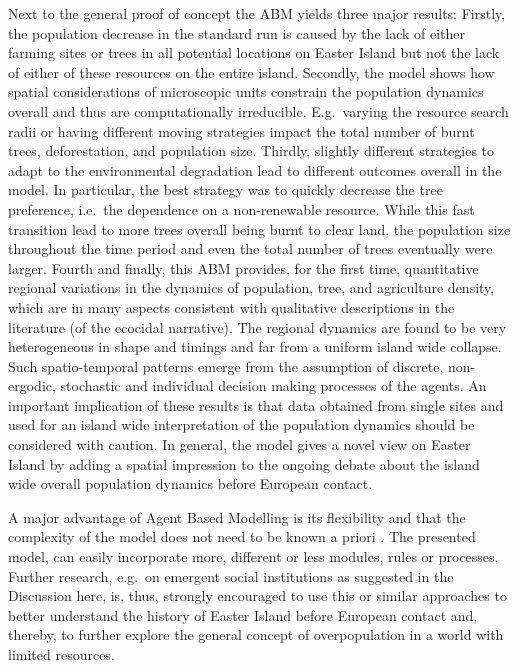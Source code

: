 Next to the general proof of concept the ABM yields three major results:
Firstly, the population decrease in the standard run is caused by the lack of either farming sites or trees in all potential locations on Easter Island but not the lack of either of these resources on the entire island.
Secondly, the model shows how spatial considerations of microscopic units constrain the population dynamics overall and thus are computationally irreducible.
E.g.\ varying the resource search radii or having different moving strategies impact the total number of burnt trees, deforestation, and population size.
Thirdly, slightly different strategies to adapt to the environmental degradation lead to different outcomes overall in the model. 
In particular, the best strategy was to quickly decrease the tree preference, i.e.\ the dependence on a non-renewable resource. While this fast transition lead to more trees overall being burnt to clear land, the population size throughout the time period and even the total number of trees eventually were larger. 
Fourth and finally, this ABM provides, for the first time, quantitative regional variations in the dynamics of population, tree, and agriculture density, which are in many aspects consistent with qualitative descriptions in the literature (of the ecocidal narrative).
The regional dynamics are found to be very heterogeneous in shape and timings and far from a uniform island wide collapse.
Such spatio-temporal patterns emerge from the assumption of discrete, non-ergodic, stochastic and individual decision making processes of the agents.
An important implication of these results is that data obtained from single sites and used for an island wide interpretation of the population dynamics should be considered with caution.
In general, the model gives a novel view on Easter Island by adding a spatial impression to the ongoing debate about the island wide overall population dynamics before European contact.


A major advantage of Agent Based Modelling is its flexibility and that the complexity of the model does not need to be known a priori \citep{Bonabeau2002}.
The presented model, can easily incorporate more, different or less modules, rules or processes.
Further research, e.g.\ on emergent social institutions as suggested in the Discussion here, is, thus, strongly encouraged to use this or similar approaches to better understand the history of Easter Island before European contact and, thereby, to further explore the general concept of overpopulation in a world with limited resources.
